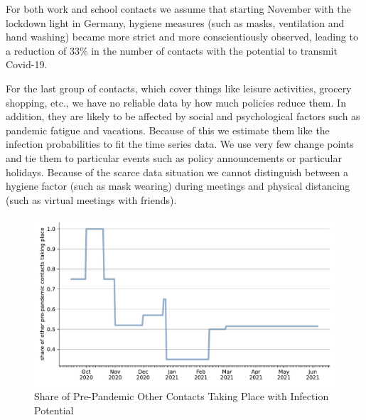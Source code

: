 For both work and school contacts we assume that starting November with the lockdown
light in Germany, hygiene measures (such as masks, ventilation and hand washing) became
more strict and more conscientiously observed, leading to a reduction of 33\% in the
number of contacts with the potential to transmit Covid-19.

For the last group of contacts, which cover things like leisure activities, grocery
shopping, etc., we have no reliable data by how much policies reduce them. In addition,
they are likely to be affected by social and psychological factors such as pandemic
fatigue and vacations. Because of this we estimate them like the infection probabilities
to fit the time series data. We use very few change points and tie them to particular
events such as policy announcements or particular holidays. Because of the scarce data
situation we cannot distinguish between a hygiene factor (such as mask wearing) during
meetings and physical distancing (such as virtual meetings with
friends).

\begin{figure}
    \centering
    \includegraphics[width=\textwidth]{figures/results/figures/data/other_multiplier}
    \caption{Share of Pre-Pandemic Other Contacts Taking Place with Infection Potential}
    \label{fig:other_multiplier}
\end{figure}

